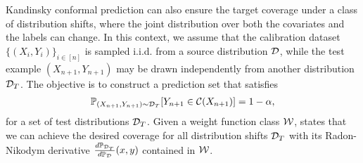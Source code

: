 Kandinsky conformal prediction can also ensure the target coverage under a class of distribution shifts, where the joint distribution over both the covariates and the labels can change. In this context, we assume that the calibration dataset $\{(X_i,Y_i)\}_{i\in[n]}$ is sampled \mbox{i.i.d.} from a source distribution ${\cal D}$, while the test example $(X_{n+1}, Y_{n+1})$ may be drawn independently from another distribution ${\cal D}_{T}$. The objective is to construct a prediction set that satisfies
\begin{align*}
    \mathbb{P}_{(X_{n+1}, Y_{n+1})\sim {\cal D}_T} [Y_{n+1} \in {\cal C}(X_{n+1})] = 1-\alpha,
\end{align*}
for a set of test distributions ${\cal D}_T$. Given a weight function class ${\cal W}$,  states that we can achieve the desired coverage for all distribution shifts ${\cal D}_{T}$ with its Radon-Nikodym derivative $\frac{d\mathbb{P}_{{\cal D}_{T}}}{d\mathbb{P}_{{\cal D}}}(x,y)$ contained in ${\cal W}$. 



